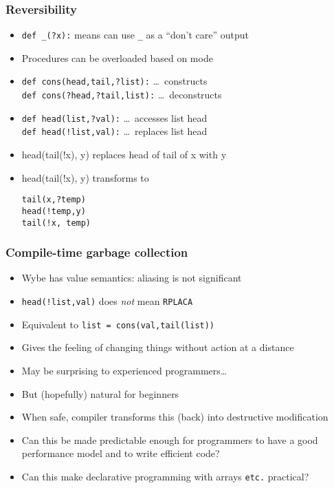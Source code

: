 \documentclass[12pt]{beamer}
\begin{document}
\begin{frame}
\frametitle{Reversibility}
\begin{itemize}
\item \texttt{def \_(?x):} means can use \texttt{\_} as a ``don't
  care'' output
\item Procedures can be overloaded based on mode
\item \texttt{def cons(head,tail,?list):}  \ldots\ constructs \\
\texttt{def cons(?head,?tail,list):}  \ldots\ deconstructs \\
\item \texttt{def head(list,?val):}  \ldots\ accesses list head \\
\texttt{def head(!list,val):}  \ldots\ replaces list head
\item head(tail(!x), y) replaces head of tail of x with y
\item head(tail(!x), y) \quad transforms to \quad
  \begin{minipage}[c]{0.4\linewidth}
  \texttt{tail(x,?temp)} \\
  \texttt{head(!temp,y)} \\
  \texttt{tail(!x, temp)}
  \end{minipage}
\end{itemize}
\end{frame}


\begin{frame}
\frametitle{Compile-time garbage collection}
\begin{itemize}
\item Wybe has value semantics:  aliasing is not significant
\item \texttt{head(!list,val)} does \emph{not} mean \texttt{RPLACA}
\item Equivalent to \texttt{list = cons(val,tail(list))}
\item Gives the feeling of changing things without action at a distance
\item May be surprising to experienced programmers\ldots
\item But (hopefully) natural for beginners
\item When safe, compiler transforms this (back) into destructive
  modification
\item Can this be made predictable enough for programmers
  to have a good performance model and to write efficient code?
\item Can this make declarative programming with arrays \texttt{etc.} practical?
\end{itemize}
\end{frame}
\end{document}
